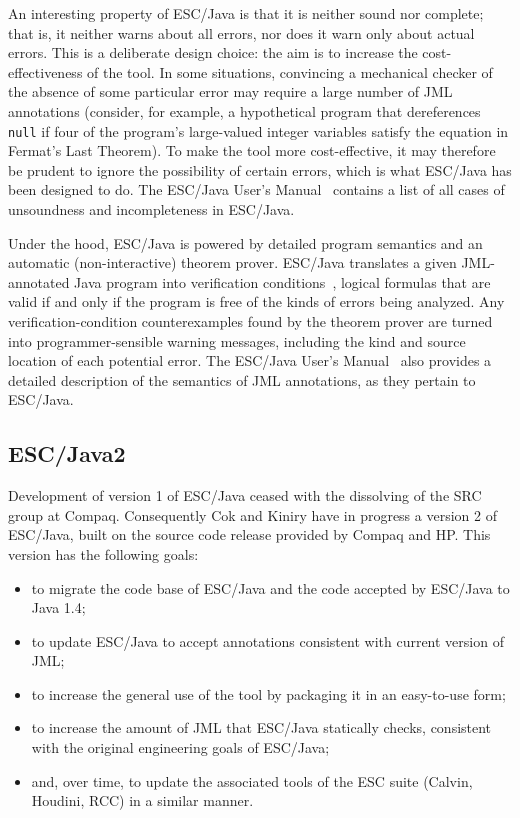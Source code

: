 An interesting property of ESC/Java is that it is neither sound nor
complete; that is, it neither warns about all errors, nor does it
warn only about actual errors.  This is a deliberate design choice:
the aim is to increase the cost-effectiveness of the tool.  In some
situations, convincing a mechanical checker of the absence of some
particular error may require a large number of JML annotations
(consider, for example, a hypothetical program that dereferences
\texttt{null} if four of the program's large-valued integer variables
satisfy the equation in Fermat's Last Theorem).  To make the tool more
cost-effective, it may therefore be prudent to ignore the possibility
of certain errors, which is what ESC/Java has been designed to do.
The ESC/Java User's Manual~\cite{escjava:userman} contains a list of
all cases of unsoundness and incompleteness in ESC/Java.

Under the hood, ESC/Java is powered by detailed program semantics and
an automatic (non-interactive) theorem prover.  ESC/Java translates a
given JML-an\-no\-tat\-ed Java program into verification
conditions~\cite{LeinoSaxeStata:JavaViaGC,FlanaganSaxe:POPL01},
logical formulas that are valid if and only if the program is free of
the kinds of errors being analyzed.  Any verification-condition
counterexamples found by the theorem prover are turned into
programmer-sensible warning messages, including the kind and source
location of each potential error.  The ESC/Java User's
Manual~\cite{escjava:userman} also provides a detailed description of
the semantics of JML annotations, as they pertain to ESC/Java.

\subsection{ESC/Java2}
\label{escjava2}

Development of version 1 of ESC/Java ceased with the dissolving of the
SRC group at Compaq.  Consequently Cok and Kiniry have in progress a
version 2 of ESC/Java, built on the source code release provided by
Compaq and HP.  This version has the following goals:
\begin{itemize}
\item to migrate the code base of ESC/Java and the code accepted by
  ESC/Java to Java 1.4;
\item to update ESC/Java to accept annotations consistent with current
  version of JML;
\item to increase the general use of the tool by packaging it in an
  easy-to-use form;
\item to increase the amount of JML that ESC/Java statically checks,
  consistent with the original engineering goals of ESC/Java;
\item and, over time, to update the associated tools of the ESC suite
  (Calvin, Houdini, RCC) in a similar manner.
\end{itemize}

